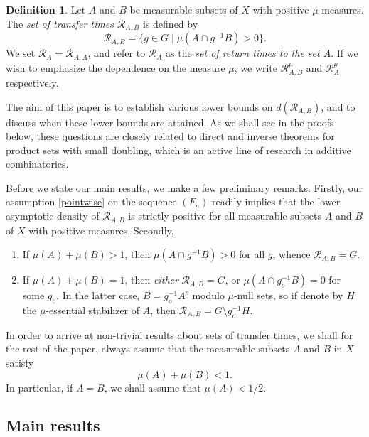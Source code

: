 \documentclass[10pt]{amsart}
\let\mathcal\mathscr
\newcommand{\cR}{\mathcal{R}}
\theoremstyle{plain}
\theoremstyle{definition}
\newtheorem{definition}[theorem]{Definition}
\begin{document}
\begin{definition}
Let $A$ and $B$ be measurable subsets of $X$ with positive $\mu$-measures. The \emph{set of transfer times $\cR_{A,B}$} is defined by
\begin{equation}
\label{def_RAB}
\cR_{A,B} = \bigl\{ g \in G \mid  \mu(A \cap g^{-1}B) > 0 \bigr\}.
\end{equation}
We set $\cR_A = \cR_{A,A}$, and refer to $\cR_A$ as the \emph{set of return times to the set $A$}. If we wish to emphasize the dependence on
the measure $\mu$, we write $\cR^\mu_{A,B}$ and $\cR^{\mu}_A$ respectively.
\end{definition}

The aim of this paper is to establish various lower bounds on $\underline{d}(\cR_{A,B})$, and to discuss when these lower bounds are attained. As we shall see in the proofs below, these questions are closely related to direct and inverse theorems for product sets with small doubling, which is an active line of research in additive combinatorics.

Before we state our main results, we make a few preliminary remarks. Firstly, our assumption \eqref{pointwise} on the sequence $(F_n)$ readily implies that the lower asymptotic density of $\cR_{A,B}$ is strictly positive for all measurable subsets $A$ and $B$ of $X$ with positive measures. Secondly,

\begin{enumerate}
\item
If $\mu(A) + \mu(B) > 1$, then $\mu(A \cap g^{-1}B) >0$ for all $g$, whence $\cR_{A,B} = G$.
\item
If $\mu(A) + \mu(B) = 1$, then \emph{either} $\cR_{A,B} = G$, or $\mu(A \cap g_o^{-1}B) = 0$ for some $g_o$.
In the latter case, $B = g_o^{-1}A^c$ modulo $\mu$-null sets, so if denote by $H$ the $\mu$-essential stabilizer of $A$,
then $\cR_{A,B} = G \setminus g_o^{-1} H$.
\end{enumerate}

In order to arrive at non-trivial results about sets of transfer times, we shall for the rest of the paper, always assume that the measurable
subsets $A$ and $B$ in $X$ satisfy
\begin{equation}
\label{standass}
\mu(A) + \mu(B) < 1.
\end{equation}
In particular, if $A = B$, we shall assume that $\mu(A) < 1/2$.

\subsection{Main results}
\end{document}
